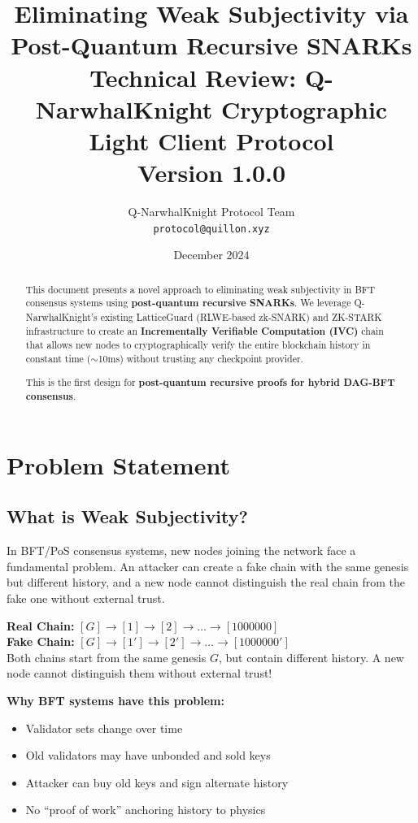 \documentclass[11pt,a4paper]{article}
\title{
    \vspace{-1cm}
    \textbf{Eliminating Weak Subjectivity via\\Post-Quantum Recursive SNARKs}\\[0.5cm]
    \large Technical Review: Q-NarwhalKnight Cryptographic Light Client Protocol\\[0.3cm]
    \normalsize Version 1.0.0
}
\author{
    Q-NarwhalKnight Protocol Team\\
    \texttt{protocol@quillon.xyz}
}
\date{December 2024}
\begin{document}
\maketitle

\begin{abstract}
This document presents a novel approach to eliminating weak subjectivity in BFT consensus systems using \textbf{post-quantum recursive SNARKs}. We leverage Q-NarwhalKnight's existing LatticeGuard (RLWE-based zk-SNARK) and ZK-STARK infrastructure to create an \textbf{Incrementally Verifiable Computation (IVC)} chain that allows new nodes to cryptographically verify the entire blockchain history in constant time ($\sim$10ms) without trusting any checkpoint provider.

This is the first design for \textbf{post-quantum recursive proofs for hybrid DAG-BFT consensus}.
\end{abstract}

\tableofcontents
\newpage

\section{Problem Statement}

\subsection{What is Weak Subjectivity?}

In BFT/PoS consensus systems, new nodes joining the network face a fundamental problem. An attacker can create a fake chain with the same genesis but different history, and a new node cannot distinguish the real chain from the fake one without external trust.

\begin{tcolorbox}[colback=red!5!white,colframe=red!75!black,title=The Weak Subjectivity Problem]
\textbf{Real Chain:} $[G] \rightarrow [1] \rightarrow [2] \rightarrow \ldots \rightarrow [1000000]$\\
\textbf{Fake Chain:} $[G] \rightarrow [1'] \rightarrow [2'] \rightarrow \ldots \rightarrow [1000000']$\\[0.3cm]
Both chains start from the same genesis $G$, but contain different history. A new node cannot distinguish them without external trust!
\end{tcolorbox}

\textbf{Why BFT systems have this problem:}
\begin{itemize}
    \item Validator sets change over time
    \item Old validators may have unbonded and sold keys
    \item Attacker can buy old keys and sign alternate history
    \item No ``proof of work'' anchoring history to physics
\end{itemize}
\end{document}
